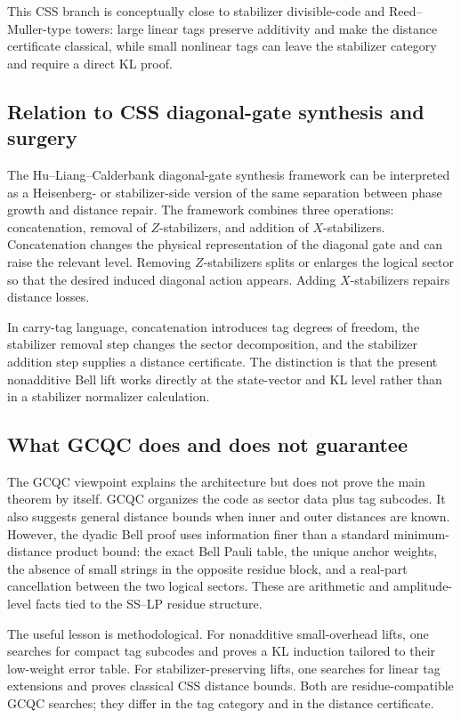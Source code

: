 \documentclass[11pt]{article}
\begin{document}
This CSS branch is conceptually close to stabilizer divisible-code and Reed--Muller-type towers:
large linear tags preserve additivity and make the distance certificate classical, while small
nonlinear tags can leave the stabilizer category and require a direct KL proof.

\subsection{Relation to CSS diagonal-gate synthesis and surgery}

The Hu--Liang--Calderbank diagonal-gate synthesis framework can be interpreted as a Heisenberg- or
stabilizer-side version of the same separation between phase growth and distance repair.  The
framework combines three operations: concatenation, removal of $Z$-stabilizers, and addition of
$X$-stabilizers.  Concatenation changes the physical representation of the diagonal gate and can
raise the relevant level.  Removing $Z$-stabilizers splits or enlarges the logical sector so that
the desired induced diagonal action appears.  Adding $X$-stabilizers repairs distance losses.

In carry-tag language, concatenation introduces tag degrees of freedom, the stabilizer removal
step changes the sector decomposition, and the stabilizer addition step supplies a distance
certificate.  The distinction is that the present nonadditive Bell lift works directly at the
state-vector and KL level rather than in a stabilizer normalizer calculation.

\subsection{What GCQC does and does not guarantee}

The GCQC viewpoint explains the architecture but does not prove the main theorem by itself.  GCQC
organizes the code as sector data plus tag subcodes.  It also suggests general distance bounds when
inner and outer distances are known.  However, the dyadic Bell proof uses information finer than a
standard minimum-distance product bound: the exact Bell Pauli table, the unique anchor weights, the
absence of small strings in the opposite residue block, and a real-part cancellation between the
two logical sectors.  These are arithmetic and amplitude-level facts tied to the SS--LP residue
structure.

The useful lesson is methodological.  For nonadditive small-overhead lifts, one searches for compact
tag subcodes and proves a KL induction tailored to their low-weight error table.  For
stabilizer-preserving lifts, one searches for linear tag extensions and proves classical CSS
distance bounds.  Both are residue-compatible GCQC searches; they differ in the tag category and
in the distance certificate.
\end{document}
